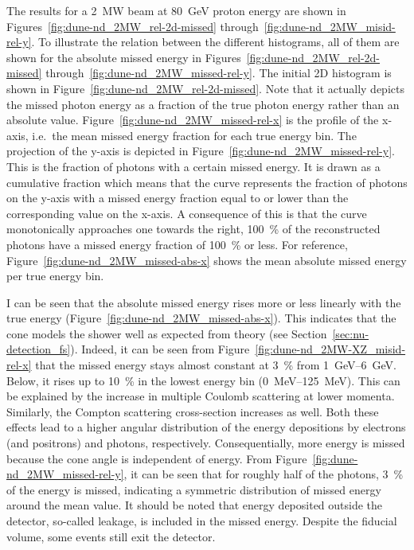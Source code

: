 The results for a \SI{2}{\mega\watt} beam at \SI{80}{\giga\electronvolt} proton energy are shown in Figures~\ref{fig:dune-nd_2MW_rel-2d-missed} through~\ref{fig:dune-nd_2MW_misid-rel-y}.
To illustrate the relation between the different histograms, all of them are shown for the absolute missed energy in Figures~\ref{fig:dune-nd_2MW_rel-2d-missed} through~\ref{fig:dune-nd_2MW_missed-rel-y}.
The initial 2D histogram is shown in Figure~\ref{fig:dune-nd_2MW_rel-2d-missed}.
Note that it actually depicts the missed photon energy as a fraction of the true photon energy rather than an absolute value.
Figure~\ref{fig:dune-nd_2MW_missed-rel-x} is the profile of the x-axis, i.e.\ the mean missed energy fraction for each true energy bin.
The projection of the y-axis is depicted in Figure~\ref{fig:dune-nd_2MW_missed-rel-y}.
This is the fraction of photons with a certain missed energy.
It is drawn as a cumulative fraction which means that the curve represents the fraction of photons on the y-axis with a missed energy fraction equal to or lower than the corresponding value on the x-axis.
A consequence of this is that the curve monotonically approaches one towards the right, \SI{100}{\percent} of the reconstructed photons have a missed energy fraction of \SI{100}{\percent} or less.
For reference, Figure~\ref{fig:dune-nd_2MW_missed-abs-x} shows the mean absolute missed energy per true energy bin.

I can be seen that the absolute missed energy rises more or less linearly with the true energy (Figure~\ref{fig:dune-nd_2MW_missed-abs-x}).
This indicates that the cone models the shower well as expected from theory (see Section~\ref{sec:nu-detection_fs}).
Indeed, it can be seen from Figure~\ref{fig:dune-nd_2MW-XZ_misid-rel-x} that the missed energy stays almost constant at \SI{3}{\percent} from \SIrange{1}{6}{\giga\electronvolt}.
Below, it rises up to \SI{10}{\percent} in the lowest energy bin (\SIrange{0}{125}{\mega\electronvolt}).
This can be explained by the increase in multiple Coulomb scattering at lower momenta.
Similarly, the Compton scattering cross-section increases as well.
Both these effects lead to a higher angular distribution of the energy depositions by electrons (and positrons) and photons, respectively.
Consequentially, more energy is missed because the cone angle is independent of energy.
From Figure~\ref{fig:dune-nd_2MW_missed-rel-y}, it can be seen that for roughly half of the photons, \SI{3}{\percent} of the energy is missed, indicating a symmetric distribution of missed energy around the mean value.
It should be noted that energy deposited outside the detector, so-called leakage, is included in the missed energy.
Despite the fiducial volume, some events still exit the detector.


